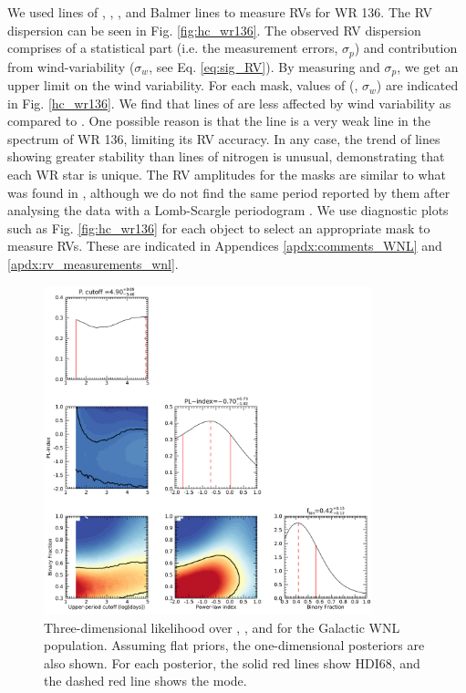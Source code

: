 We used lines of \heii{}, \niii{}, \niv{}, \nv{} and Balmer lines to measure RVs for WR 136. The RV dispersion can be seen in Fig. \ref{fig:hc_wr136}. The observed RV dispersion comprises of a statistical part (i.e. the measurement errors, $\sigma_p$) and contribution from wind-variability ($\sigma_w$, see Eq. \ref{eq:sig_RV}). By measuring \sigRV{} and $\sigma_p$, we get an upper limit on the wind variability. For each mask, values of (\sigRV{}, $\sigma_w$) are indicated in Fig. \ref{hc_wr136}. We find that lines of \heii{} are less affected by wind variability as compared to \NVred{}. One possible reason is that the \NVred{} line is a very weak line in the spectrum of WR 136, limiting its RV accuracy. In any case, the trend of \heii{} lines showing greater stability than lines of nitrogen is unusual, demonstrating that each WR star is unique. The RV amplitudes for the masks are similar to what was found in \citet{koenigsberger_spectral_1980}, although we do not find the same period reported by them after analysing the data with a Lomb-Scargle periodogram \citep{lomb_least-squares_1976,scargle_studies_1982}. We use diagnostic plots such as Fig. \ref{fig:hc_wr136} for each object to select an appropriate mask to measure RVs. These are indicated in Appendices \ref{apdx:comments_WNL} and \ref{apdx:rv_measurements_wnl}. 
\begin{figure}[ht]
    \centering
    \includegraphics[width=0.85\textwidth]{chapters/WNL/image/WNL_May18_4RVbins_stat9.png}
    \caption{Three-dimensional likelihood over \logPmaxWNL{}, \fintWNL{}, and \piWNL{} for the Galactic WNL population. Assuming flat priors, the one-dimensional posteriors are also shown. For each posterior, the solid red lines show HDI68, and the dashed red line shows the mode.}
    \label{fig:posteriors_WNL}
\end{figure}


